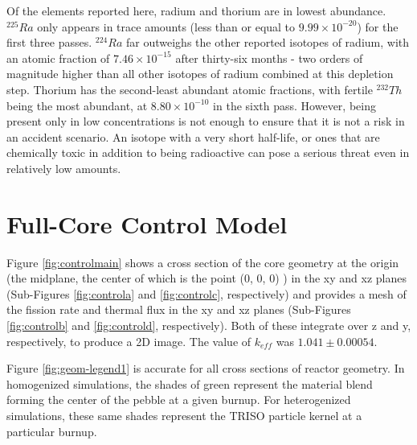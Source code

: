 Of the elements reported here, radium and thorium are in lowest abundance.  $^{225}Ra$ only appears in trace amounts (less than or equal to $9.99\times10^{-20}$) for the first three passes.  $^{224}Ra$ far outweighs the other reported isotopes of radium, with an atomic fraction of $7.46\times10^{-15}$ after thirty-six months - two orders of magnitude higher than all other isotopes of radium combined at this depletion step.  Thorium has the second-least abundant atomic fractions, with fertile $^{232}Th$ being the most abundant, at $8.80\times10^{-10}$ in the sixth pass.  However, being present only in low concentrations is not enough to ensure that it is not a risk in an accident scenario.  An isotope with a very short half-life, or ones that are chemically toxic in addition to being radioactive can pose a serious threat even in relatively low amounts.

\section{Full-Core Control Model}
\label{res-control}

Figure \ref{fig:controlmain} shows a cross section of the core geometry at the origin (the midplane, the center of which is the point (0, 0, 0) ) in the xy and xz planes (Sub-Figures \ref{fig:controla} and \ref{fig:controlc}, respectively) and provides a mesh of the fission rate and thermal flux in the xy and xz planes (Sub-Figures \ref{fig:controlb} and \ref{fig:controld}, respectively).  Both of these integrate over z and y, respectively, to produce a 2D image.  The value of $k_{eff}$ was $1.041 \pm 0.00054$.

Figure \ref{fig:geom-legend1} is accurate for all cross sections of reactor geometry.  In homogenized simulations, the shades of green represent the material blend forming the center of the pebble at a given burnup.  For heterogenized simulations, these same shades represent the TRISO particle kernel at a particular burnup.



